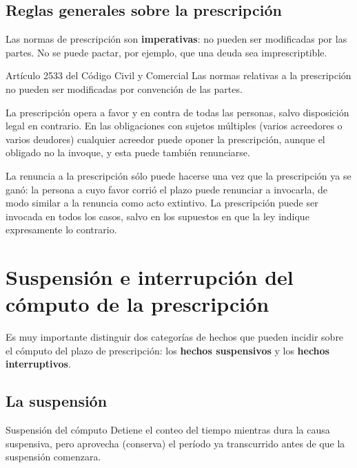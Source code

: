 \documentclass[12pt,oneside]{book}
\begin{document}
\subsection{Reglas generales sobre la prescripción}

Las normas de prescripción son \textbf{imperativas}: no pueden ser modificadas por las partes. No se puede pactar, por ejemplo, que una deuda sea imprescriptible.

\begin{articulo}{Artículo 2533 del Código Civil y Comercial}
Las normas relativas a la prescripción no pueden ser modificadas por convención de las partes.
\end{articulo}

La prescripción opera a favor y en contra de todas las personas, salvo disposición legal en contrario. En las obligaciones con sujetos múltiples (varios acreedores o varios deudores) cualquier acreedor puede oponer la prescripción, aunque el obligado no la invoque, y esta puede también renunciarse. %

La renuncia a la prescripción sólo puede hacerse una vez que la prescripción ya se ganó: la persona a cuyo favor corrió el plazo puede renunciar a invocarla, de modo similar a la renuncia como acto extintivo. La prescripción puede ser invocada en todos los casos, salvo en los supuestos en que la ley indique expresamente lo contrario.

\section{Suspensión e interrupción del cómputo de la prescripción}

Es muy importante distinguir dos categorías de hechos que pueden incidir sobre el cómputo del plazo de prescripción: los \textbf{hechos suspensivos} y los \textbf{hechos interruptivos}.

\subsection{La suspensión}

\begin{definition}{Suspensión del cómputo}
Detiene el conteo del tiempo mientras dura la causa suspensiva, pero aprovecha (conserva) el período ya transcurrido antes de que la suspensión comenzara.
\end{definition}
\end{document}
